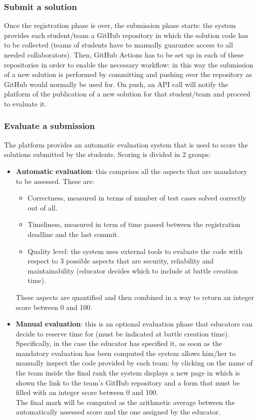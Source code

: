 \subsubsection{Submit a solution}
Once the registration phase is over, the submission phase starts: the system provides each student/team a GitHub repository in which the solution code has to be collected (teams of students have to manually guarantee access to all needed collaborators). Then, GitHub Actions has to be set up in each of these repositories in order to enable the necessary workflow: in this way the submission of a new solution is performed by committing and pushing over the repository as GitHub would normally be used for. On push, an API call will notify the platform of the publication of a new solution for that student/team and proceed to evaluate it.
\subsubsection{Evaluate a submission}
The platform provides an automatic evaluation system that is used to score the solutions submitted by the students. Scoring is divided in 2 groups:
\begin{itemize}
    \item \textbf{Automatic evaluation}: this comprises all the aspects that are mandatory to be assessed. These are:
    \begin{itemize}
        \item Correctness, measured in terms of number of test cases solved correctly out of all.
        \item Timeliness, measured in term of time passed between the registration deadline and the last commit.
        \item Quality level: the system uses external tools to evaluate the code with respect to 3 possible aspects that are security, reliability and maintainability (educator decides which to include at battle creation time).
    \end{itemize}
    These aspects are quantified and then combined in a way to return an integer score between 0 and 100.
    \item \textbf{Manual evaluation}: this is an optional evaluation phase that educators can decide to reserve time for (must be indicated at battle creation time). Specifically, in the case the educator has specified it, as soon as the mandatory evaluation has been computed the system allows him/her to manually inspect the code provided by each team: by clicking on the name of the team inside the final rank the system displays a new page in which is shown the link to the team’s GitHub repository and a form that must be filled with an integer score between 0 and 100.\\ The final mark will be computed as the arithmetic average between the automatically assessed score and the one assigned by the educator.
\end{itemize}

